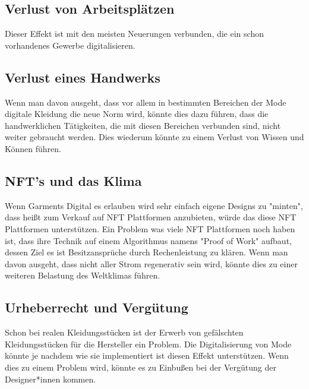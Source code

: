 \documentclass{article}
\begin{document}
\subsection{Verlust von Arbeitsplätzen}
Dieser Effekt ist mit den meisten Neuerungen verbunden, die ein schon vorhandenes Gewerbe digitalisieren.

\subsection{Verlust eines Handwerks}
Wenn man davon ausgeht, dass vor allem in bestimmten Bereichen der Mode digitale Kleidung die neue Norm wird, könnte dies dazu führen, dass die handwerklichen Tätigkeiten, die mit diesen Bereichen verbunden sind, nicht weiter gebraucht werden. Dies wiederum könnte zu einem Verlust von Wissen und Können führen.

\subsection{NFT's und das Klima}
Wenn Garments Digital es erlauben wird sehr einfach eigene Designs zu "minten", dass heißt zum Verkauf auf NFT Plattformen anzubieten, würde das diese NFT Plattformen unterstützen. Ein Problem was viele NFT Plattformen noch haben ist, dass ihre Technik auf einem Algorithmus namens "Proof of Work" aufbaut, dessen Ziel es ist Besitzansprüche durch Rechenleistung zu klären. Wenn man davon ausgeht, dass nicht aller Strom regenerativ sein wird, könnte dies zu einer weiteren Belastung des Weltklimas führen.

\subsection{Urheberrecht und Vergütung}
Schon bei realen Kleidungsstücken ist der Erwerb von gefälschten Kleidungsstücken für die Hersteller ein Problem. Die Digitalisierung von Mode könnte je nachdem wie sie implementiert ist diesen Effekt unterstützen. Wenn dies zu einem Problem wird, könnte es zu Einbußen bei der Vergütung der Designer*innen kommen.

\newpage
\end{document}
